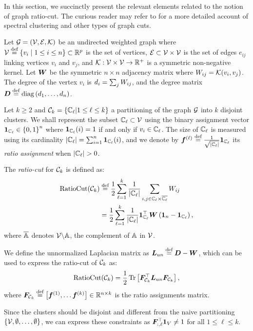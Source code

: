 In this section, we succinctly present the relevant elements related to the notion
of graph ratio-cut. The curious reader may refer to \citet{spectralclustering} for
a more detailed account of spectral clustering and other types of graph cuts.

Let ${\mathcal{G}}=({\mathcal{V}},{\mathcal{E}},{\mathcal{K}})$ be an undirected weighted graph where ${\mathcal{V}} \stackrel{\text{def}}{=} \left\lbrace v_i
\mid 1 \leq i \leq n\right\rbrace \subset \mathbb{R}^p$ is the set of vertices, ${\mathcal{E}} \subset
{\mathcal{V}} \times {\mathcal{V}}$ is the set of edges $e_{ij}$ linking vertices $v_i$ and $v_j$, and
${\mathcal{K}}: {\mathcal{V}} \times {\mathcal{V}} \to \mathbb{R}^+$ is a symmetric non-negative kernel. Let ${\bm{W}}$ be the
symmetric $n \times n$ adjacency matrix where ${W}_{ij} = {\mathcal{K}}(v_i, v_j)$. The
degree of the vertex $v_i$ is $d_i=\sum_j {W}_{ij}$, and the degree matrix
${\bm{D}}\stackrel{\text{def}}{=}\mathop{\mathrm{diag}}{(d_1,\ldots,d_n)}$.

Let $k \geq 2$ and ${\mathcal{C}}_k=\left\lbrace{\mathbb{C}}_\ell|1\leq\ell\leq k\right\rbrace$ a partitioning of the
graph ${\mathcal{G}}$ into $k$ disjoint clusters. We shall represent the subset ${\mathbb{C}}_\ell
\subset {\mathcal{V}}$ using the binary assignment vector $\bm{1}_{{\mathbb{C}}_\ell} \in \left\lbrace0,1\right\rbrace^n$
where $\bm{1}_{{\mathbb{C}}_\ell}(i)=1$ if and only if $v_i \in {\mathbb{C}}_\ell$. The size of ${\mathbb{C}}_\ell$
is measured using its cardinality $|{\mathbb{C}}_\ell| = \sum_{i=1}^n \bm{1}_{{\mathbb{C}}_\ell}(i)$, and
we denote by ${\bm{f}}^{(\ell)} \stackrel{\text{def}}{=} {\frac{1}{\sqrt{|{\mathbb{C}}_\ell|}}} \bm{1}_{{\mathbb{C}}_\ell}$ its
\textit{ratio assignment} when $|{\mathbb{C}}_\ell| >0$.

The \textit{ratio-cut} for ${\mathcal{C}}_k$ is defined as:
\begin{align} \label{eq:ratiocut}
	\operatorname*{RatioCut}({\mathcal{C}}_k) & \stackrel{\text{def}}{=} {\frac{1}{2}}\sum_{\ell=1}^{k} {\frac{1}{|{\mathbb{C}}_\ell|}}
	\sum_{i,j\in {\mathbb{C}}_\ell\times \overline{{\mathbb{C}}_\ell}} {W}_{ij}        \\
	             & = {\frac{1}{2}}\sum_{\ell=1}^{k} {\frac{1}{|{\mathbb{C}}_\ell|}}
	\bm{1}_{{\mathbb{C}}_\ell}^\top {\bm{W}} \left(\bm{1}_n-\bm{1}_{{\mathbb{C}}_\ell}\right),
\end{align}
where $\overline{{\mathbb{A}}}$ denotes ${\mathcal{V}}\backslash {\mathbb{A}}$, the complement of ${\mathbb{A}}$ in ${\mathcal{V}}$.

We define the unnormalized Laplacian matrix as ${\bm{L}}_{un}\stackrel{\text{def}}{=} {\bm{D}}-{\bm{W}}$, which can
be used to express the ratio-cut of ${\mathcal{C}}_k$ as:
\begin{align}
	\label{eq:rawlap}
	\operatorname*{RatioCut}({\mathcal{C}}_k)
	={\frac{1}{2}}\operatorname{Tr}\left[{\bm{F}}_{{\mathcal{C}}_k}^\top {\bm{L}}_{un} {\bm{F}}_{{\mathcal{C}}_k}\right],
\end{align}
where ${\bm{F}}_{{\mathcal{C}}_k} \stackrel{\text{def}}{=} \left[{\bm{f}}^{(1)},\ldots {\bm{f}}^{(k)}\right]\in \mathbb{R}^{n \times k}$ is the
ratio assignments matrix.

Since the clusters should be disjoint and different from the naive partitioning
$\left\lbrace{\mathcal{V}},\emptyset,\ldots,\emptyset\right\rbrace$, we can express these constraints as
${\bm{F}}_{:,\ell}^\top\bm{1}_{V}\neq 1$ for all $1\leq \ell\leq k$.


